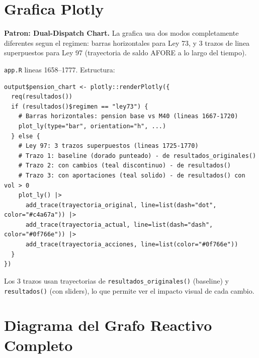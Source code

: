 \documentclass[11pt, letterpaper, twoside]{report}
\begin{document}
\section{Grafica Plotly}
\label{sec:plotly}

\begin{patronbox}
\textbf{Patron: Dual-Dispatch Chart.} La grafica usa dos modos completamente
diferentes segun el regimen: barras horizontales para Ley 73, y 3 trazos de linea
superpuestos para Ley 97 (trayectoria de saldo AFORE a lo largo del tiempo).
\end{patronbox}

\begin{codigobox}
\texttt{app.R} lineas 1658--1777. Estructura:
\begin{lstlisting}[caption={Grafica Plotly dual-mode}]
output$pension_chart <- plotly::renderPlotly({
  req(resultados())
  if (resultados()$regimen == "ley73") {
    # Barras horizontales: pension base vs M40 (lineas 1667-1720)
    plot_ly(type="bar", orientation="h", ...)
  } else {
    # Ley 97: 3 trazos superpuestos (lineas 1725-1770)
    # Trazo 1: baseline (dorado punteado) - de resultados_originales()
    # Trazo 2: con cambios (teal discontinuo) - de resultados()
    # Trazo 3: con aportaciones (teal solido) - de resultados() con vol > 0
    plot_ly() |>
      add_trace(trayectoria_original, line=list(dash="dot", color="#c4a67a")) |>
      add_trace(trayectoria_actual, line=list(dash="dash", color="#0f766e")) |>
      add_trace(trayectoria_acciones, line=list(color="#0f766e"))
  }
})
\end{lstlisting}
Los 3 trazos usan trayectorias de \texttt{resultados\_originales()} (baseline) y
\texttt{resultados()} (con sliders), lo que permite ver el impacto visual de cada cambio.
\end{codigobox}


\section{Diagrama del Grafo Reactivo Completo}
\end{document}
